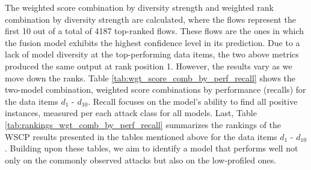 

The weighted score combination by diversity strength and weighted rank combination by diversity strength are calculated, where the flows represent the first 10 out of a total of 4187 top-ranked flows. These flows are the ones in which the fusion model exhibits the highest confidence level in its prediction. Due to a lack of model diversity at the top-performing data items, the two above metrics produced the same output at rank position 1. However, the results vary as we move down the ranks. Table \ref{tab:wgt_score_comb_by_perf_recall} shows the two-model combination, weighted score combinations by performance (recalls) for the data items $d_{1}$ - $d_{10}$. Recall focuses on the model's ability to find all positive instances, measured per each attack class for all models. Last, Table \ref{tab:rankings_wgt_comb_by_perf_recall} summarizes the rankings of the WSCP results presented in the tables mentioned above for the data items $d_{1}$ - $d_{10}$. Building upon these tables, we aim to identify a model that performs well not only on the commonly observed attacks but also on the low-profiled ones.


